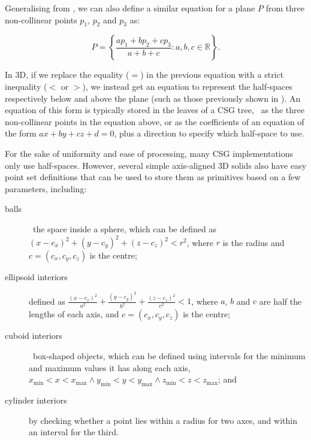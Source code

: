 Generalising from , we can also define a similar equation for a plane \(P\) from three non-collinear points \(p_1\), \(p_2\) and \(p_3\) as:

\begin{equation}
P = \left\{ \frac{a p_1 + b p_2 + c p_3}{a+b+c} : a,b,c \in \mathbb{R} \right\}.
\end{equation}

In 3D, if we replace the equality (\(=\)) in the previous equation with a strict inequality (\(<\) or \(>\)), we instead get an equation to represent the half-spaces respectively below and above the plane (such as those previously shown in ).
An equation of this form is typically stored in the leaves of a CSG tree, \eg\ as the three non-collinear points in the equation above, or as the coefficients of an equation of the form \(ax + by + cz + d = 0 \), plus a direction to specify which half-space to use.

For the sake of uniformity and ease of processing, many CSG implementations only use half-spaces.
However, several simple axis-aligned 3D solids also have easy point set definitions that can be used to store them as primitives based on a few parameters, including:

\begin{description}
\item[balls] \ie\ the space inside a sphere, which can be defined as \( (x-c_x)^2 + (y-c_y)^2 + (z-c_z)^2 < r^2\), where \(r\) is the radius and \(c = (c_x, c_y, c_z)\) is the centre;
\item[ellipsoid interiors] defined as \( \frac{(x-c_x)^2}{a^2} + \frac{(y-c_y)^2}{b^2} + \frac{(z-c_z)^2}{c^2} < 1 \), where \(a\), \(b\) and \(c\) are half the lengths of each axis, and \(c = (c_x, c_y, c_z)\) is the centre;
\item[cuboid interiors] \ie\ box-shaped objects, which can be defined using intervals for the minimum and maximum values it has along each axis, \ie\ \( x_\mathrm{min} < x < x_\mathrm{max} \wedge y_\mathrm{min} < y < y_\mathrm{max} \wedge z_\mathrm{min} < z < z_\mathrm{max} \); and
\item[cylinder interiors] by checking whether a point lies within a radius for two axes, and within an interval for the third.
\end{description}

